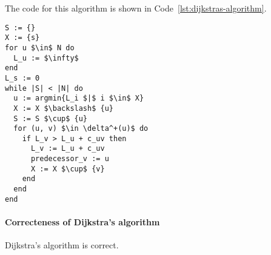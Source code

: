 \documentclass[english]{article}
\begin{document}
\bigskip
The code for this algorithm is shown in Code~\ref{lst:dijkstras-algorithm}.

\begin{lstlisting}[style=custom, language=pseudocode, caption={Dijkstra's algorithm}, label={lst:dijkstras-algorithm}, float]
S := {}
X := {s}
for u $\in$ N do
  L_u := $\infty$
end
L_s := 0
while |S| < |N| do
  u := argmin{L_i $|$ i $\in$ X}
  X := X $\backslash$ {u}
  S := S $\cup$ {u}
  for (u, v) $\in \delta^+(u)$ do
    if L_v > L_u + c_uv then
      L_v := L_u + c_uv
      predecessor_v := u
      X := X $\cup$ {v}
    end
  end
end
\end{lstlisting}

\paragraph{Correcteness of Dijkstra's algorithm}

\begin{proposition}
  Dijkstra's algorithm is correct.
\end{proposition}
\end{document}
